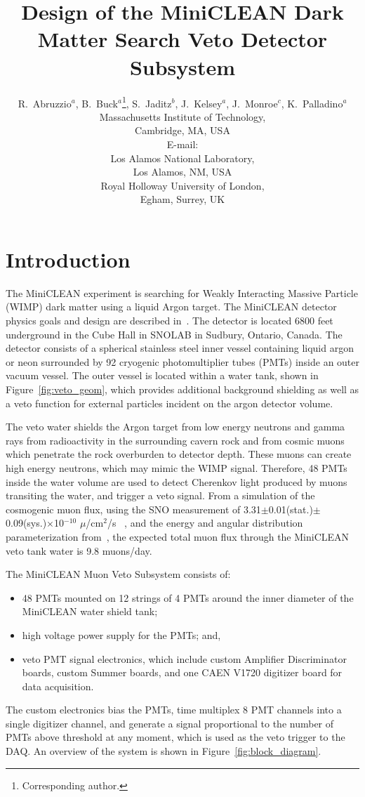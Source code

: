 \documentclass{JINST}
\title{Design of the MiniCLEAN Dark Matter Search Veto Detector Subsystem}
\author{R.~Abruzzio$^a$, B.~Buck$^a$\thanks{Corresponding author.}, S.~Jaditz$^b$, J.~Kelsey$^a$, J.~Monroe$^c$, K.~Palladino$^a$\\
\llap{$^a$}Massachusetts Institute of Technology,\\
	Cambridge, MA, USA\\
	E-mail: \email{bbuck@mit.edu}\\
\llap{$^b$}Los Alamos National Laboratory,\\
	Los Alamos, NM, USA\\
\llap{$^c$}Royal Holloway University of London,\\
	Egham, Surrey, UK}
\begin{document}
\section{Introduction}
\label{Introduction}
The MiniCLEAN experiment is searching for Weakly Interacting Massive Particle
(WIMP) dark matter using a liquid Argon target.  The MiniCLEAN detector
physics goals and design are described in~\cite{ref:miniclean_physics}.  The
detector is located 6800 feet underground in the Cube Hall in SNOLAB in
Sudbury, Ontario, Canada.  The detector consists of a spherical stainless
steel inner vessel containing liquid argon or neon surrounded by 92 cryogenic
photomultiplier tubes (PMTs) inside an outer vacuum vessel. The outer vessel
is located within a water tank, shown in Figure~\ref{fig:veto_geom}, which
provides additional background shielding as well as a veto function for
external particles incident on the argon detector volume.  

The veto water shields the Argon target from low energy neutrons and gamma
rays from radioactivity in the surrounding cavern rock and from cosmic muons
which penetrate the rock overburden to detector depth.  These muons can
create high energy neutrons, which may mimic the WIMP signal.  Therefore, 48
PMTs inside the water volume are used to detect Cherenkov light produced by
muons transiting the water, and trigger a veto signal.  From a simulation of
the cosmogenic muon flux, using the SNO measurement of
3.31$\pm$0.01(stat.)$\pm$0.09(sys.)$\times$10$^{-10}$ $\mu$/cm$^2$/s
~\cite{ref:sno_muon_flux}, and the energy and angular distribution
parameterization from~\cite{ref:mei_and_hime}, the expected total muon flux
through the MiniCLEAN veto tank water is 9.8 muons/day.  

The MiniCLEAN Muon Veto Subsystem consists of:
\begin{itemize}
\item 48 PMTs mounted on 12 strings of 4 PMTs around the inner diameter of the MiniCLEAN water shield tank;
\item high voltage power supply for the PMTs; and,
\item veto PMT signal electronics, which include custom Amplifier Discriminator boards, custom Summer boards, and one CAEN V1720 digitizer board for data acquisition.
\end{itemize}
The custom electronics bias the PMTs, time multiplex 8 PMT channels into a
single digitizer channel, and generate a signal proportional to the number
of PMTs above threshold at any moment, which is used as the veto trigger to
the DAQ.  An overview of the system is shown in
Figure~\ref{fig:block_diagram}.
\end{document}
